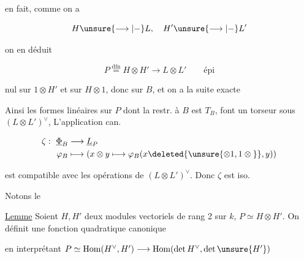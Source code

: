 
en fait, comme on a

\[
H\unsure{\longrightarrow|-}L,\quad H'\unsure{\longrightarrow|-} L'
\]

on en déduit

\[
P\overset{\mathrm{dfn}}{=}H\otimes H'\longrightarrow L\otimes L'\qquad\text{épi}
\]

nul sur $1\otimes H'$ et sur $H\otimes1$, donc sur
$B$, et on a la suite exacte


Ainsi les formes linéaires  sur
$P$ dont la restr. à $B$ est $T_B$, font
un torseur  sous $(L\otimes L')^\vee$, L'application
can.


\[
\begin{aligned}
\zeta:\ \underline{\Phi}_B&\longrightarrow\underline L_P\\
\varphi_B&\longmapsto (x\otimes y\longmapsto\varphi_B(x\deleted{\unsure{\otimes1,1\otimes{}}},y))
\end{aligned}
\]

est compatible avec les opérations
de $(L\otimes L')^\vee$. Donc $\zeta$ est iso.

Notons le

\uline{Lemme} Soient $H,H'$ deux modules vectoriels
de rang 2 sur $k$, $P\simeq H\otimes H'$. On définit
une fonction quadratique canonique


en interprétant $P\simeq\mathrm{Hom}(H^\vee,H')\longrightarrow\mathrm{Hom}(\det H^\vee,\det\unsure{H'})$

